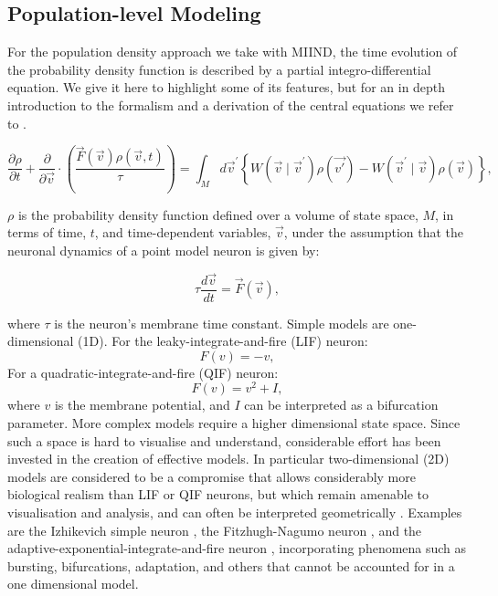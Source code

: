 \documentclass[utf8]{frontiersSCNS} %
\begin{document}
\subsection{Population-level Modeling}

For the population density approach we take with MIIND, the time evolution of the probability density function is described by a partial integro-differential equation. We give it here to highlight some of its features, but for an in depth introduction to the formalism and a derivation of the central equations we refer to \cite{omurtag2000}.

\begin{equation}                                        
  \frac{ \partial \rho }{ \partial t } + \frac{\partial}{ \partial \vec{v}} \cdot ( \frac{\vec{F}(\vec{v}) \rho(\vec{v},t)}{\tau} ) = \int_{M} d \vec{v}^{\prime} \left\{ W(\vec{v} \mid \vec{v}^{\prime})\rho(\vec{v'}) - W(\vec{v}^{\prime} \mid \vec{v}  )\rho(\vec{v}) \right\},
\label{eq-balance}                                          
\end{equation}  

$\rho$ is the probability density function defined over a volume of state space, $M$, in terms of time, $t$, and time-dependent variables, $\vec{v}$, under the assumption that the neuronal dynamics of a point model neuron is given by:

\begin{equation}
\tau \frac{ d \vec{v}}{dt} = \vec{F}(\vec{v}), 
\end{equation}

where $\tau$ is the neuron's membrane time constant. Simple models are one-dimensional (1D). 
For the leaky-integrate-and-fire (LIF) neuron: 
\begin{equation}
F(v) = -v,
\end{equation}  
For a quadratic-integrate-and-fire (QIF) neuron:
\begin{equation}
F(v)= v^2 + I,
\end{equation}  
where $v$ is the membrane potential, and $I$ can be interpreted as a bifurcation parameter. More complex models require a higher dimensional state space. Since such a space is hard to visualise and understand, considerable effort has been invested in the creation of effective models. In particular two-dimensional (2D) models are considered to be a compromise that allows considerably more biological realism than LIF or QIF neurons, but which remain amenable to visualisation and analysis, and can often be interpreted geometrically \citep{izhikevich2007dynamical}. Examples are the Izhikevich simple neuron \citep{izhikevich2003simple}, the Fitzhugh-Nagumo neuron \citep{fitzhugh1961impulses,nagumo1962active}, and the adaptive-exponential-integrate-and-fire neuron \citep{brette2005}, incorporating phenomena such as bursting, bifurcations, adaptation, and others that cannot be accounted for in a one dimensional model.
\end{document}

